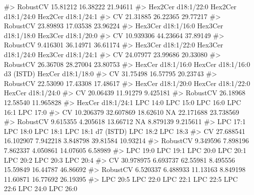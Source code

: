 \documentclass[
  letterpaper,
  DIV=11,
  numbers=noendperiod]{scrreprt}
\newenvironment{Shaded}{\begin{snugshade}}{\end{snugshade}}
\newcommand{\CommentTok}[1]{\textcolor[rgb]{0.37,0.37,0.37}{#1}}
\begin{document}
\begin{Shaded}
\begin{Highlighting}[]
\CommentTok{\#\textgreater{} RobustCV                     15.81212           16.38222           21.94611}
\CommentTok{\#\textgreater{}          Hex2Cer d18:1/22:0 Hex2Cer d18:1/24:0 Hex2Cer d18:1/24:1}
\CommentTok{\#\textgreater{} CV                 21.31885           26.22365           29.77217}
\CommentTok{\#\textgreater{} RobustCV           23.89893           17.03538           23.96224}
\CommentTok{\#\textgreater{}          Hex3Cer d18:1/16:0 Hex3Cer d18:1/18:0 Hex3Cer d18:1/20:0}
\CommentTok{\#\textgreater{} CV                10.939306           44.23664           37.89149}
\CommentTok{\#\textgreater{} RobustCV           9.416301           36.14971           36.61174}
\CommentTok{\#\textgreater{}          Hex3Cer d18:1/22:0 Hex3Cer d18:1/24:0 Hex3Cer d18:1/24:1}
\CommentTok{\#\textgreater{} CV                 24.07977           23.99686           20.33080}
\CommentTok{\#\textgreater{} RobustCV           26.36708           28.27004           23.80753}
\CommentTok{\#\textgreater{}          HexCer d18:1/16:0 HexCer d18:1/16:0 d3 (ISTD) HexCer d18:1/18:0}
\CommentTok{\#\textgreater{} CV                31.75498                    16.57795          20.23743}
\CommentTok{\#\textgreater{} RobustCV          22.53090                    17.43308          17.48617}
\CommentTok{\#\textgreater{}          HexCer d18:1/20:0 HexCer d18:1/22:0 HexCer d18:1/24:0}
\CommentTok{\#\textgreater{} CV                20.06439          11.91279          9.425181}
\CommentTok{\#\textgreater{} RobustCV          26.18968          12.58540         11.965828}
\CommentTok{\#\textgreater{}          HexCer d18:1/24:1  LPC 14:0 LPC 15:0 LPC 16:0  LPC 16:1  LPC 17:0}
\CommentTok{\#\textgreater{} CV               10.206379 32.607869 18.62610       NA 22.171688 23.738569}
\CommentTok{\#\textgreater{} RobustCV          9.615355  4.205618 13.66712       NA  8.879139  9.215611}
\CommentTok{\#\textgreater{}           LPC 17:1  LPC 18:0 LPC 18:1 LPC 18:1 d7 (ISTD) LPC 18:2 LPC 18:3}
\CommentTok{\#\textgreater{} CV       27.688541 16.102907 7.942218           3.848798 39.81584 10.93214}
\CommentTok{\#\textgreater{} RobustCV  9.349596  7.898196 7.862337           4.050861 14.07605  6.58989}
\CommentTok{\#\textgreater{}           LPC 19:0 LPC 19:1 LPC 20:0 LPC 20:1 LPC 20:2 LPC 20:3 LPC 20:4}
\CommentTok{\#\textgreater{} CV       30.978975 6.693737 62.55981 8.495556 15.59849 16.44787 46.86692}
\CommentTok{\#\textgreater{} RobustCV  6.520337 6.488933 11.13163 8.849198 11.60871 16.77692 26.19395}
\CommentTok{\#\textgreater{}          LPC 20:5 LPC 22:0  LPC 22:1 LPC 22:5 LPC 22:6 LPC 24:0 LPC 26:0}

\end{Highlighting}
\end{Shaded}
\end{document}
